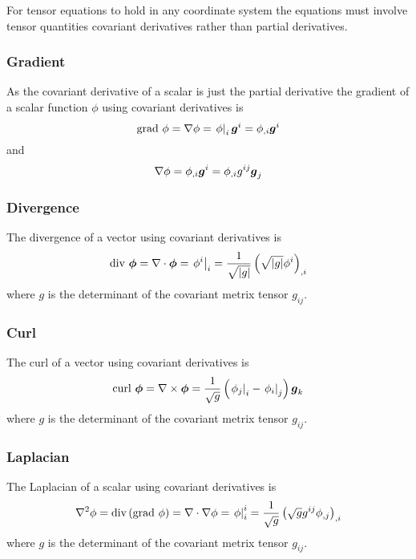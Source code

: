 For tensor equations to hold in any coordinate system the equations must
involve tensor quantities \ie covariant derivatives rather than partial derivatives.

\subsubsection{Gradient}

As the covariant derivative of a scalar is just the partial derivative the
gradient of a scalar function $\phi$ using covariant derivatives is
\begin{equation}
  \text{grad } \phi = \grad{\phi}=\covarderiv{\phi}{i}\vect{g}^{i}=\phi_{,i}\vect{g}^{i}
\end{equation}
and
\begin{equation}
  \grad{\phi}=\phi_{,i}\vect{g}^{i}=\phi_{,i}g^{ij}\vect{g}_{j}
\end{equation}

\subsubsection{Divergence}

The divergence of a vector using covariant derivatives is
\begin{equation}
  \text{div } \vect{\phi} = \diverg{\vect{\phi}}=\covarderiv{\phi^{i}}{i}=\frac{1}{\sqrt{\abs{g}}}\pbrac{\sqrt{\abs{g}}\phi^{i}}_{,i}
\end{equation}
where $g$ is the determinant of the covariant metrix tensor $g_{ij}$.

\subsubsection{Curl}

The curl of a vector using covariant derivatives is
\begin{equation}
  \text{curl } \vect{\phi} = \curl{\vect{\phi}}=\frac{1}{\sqrt{g}}\pbrac{\covarderiv{\phi_{j}}{i}-\covarderiv{\phi_{i}}{j}}\vect{g}_{k}
\end{equation}
where $g$ is the determinant of the covariant metrix tensor $g_{ij}$.

\subsubsection{Laplacian}

The Laplacian of a scalar using covariant derivatives is
\begin{equation}
  \nabla^{2} {\phi}=\text{div}\left( \text{grad }\phi \right)= \nabla\cdot\nabla\phi = \left. \phi \right|^{i}_{i} =\frac{1}{\sqrt{g}}\left( \sqrt{g}g^{ij}\phi_{,j} \right)_{,i}
\end{equation}
where $g$ is the determinant of the covariant metrix tensor $g_{ij}$.

